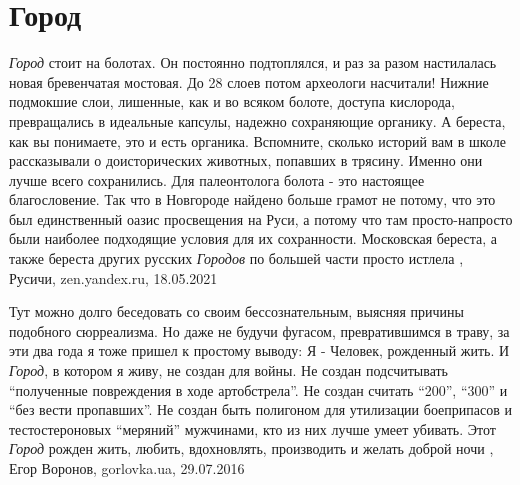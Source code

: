  
 
 
 
 
\chapter{Город}
\label{sec:slova.gorod}

\emph{Город} стоит на болотах. Он постоянно подтоплялся, и раз за разом настилалась
новая бревенчатая мостовая. До 28 слоев потом археологи насчитали! Нижние
подмокшие слои, лишенные, как и во всяком болоте, доступа кислорода,
превращались в идеальные капсулы, надежно сохраняющие органику. А береста, как
вы понимаете, это и есть органика.  Вспомните, сколько историй вам в школе
рассказывали о доисторических животных, попавших в трясину. Именно они лучше
всего сохранились. Для палеонтолога болота - это настоящее благословение.  Так
что в Новгороде найдено больше грамот не потому, что это был единственный оазис
просвещения на Руси, а потому что там просто-напросто были наиболее подходящие
условия для их сохранности. Московская береста, а также береста других русских
\emph{Городов} по большей части просто истлела
, 
Русичи, zen.yandex.ru, 18.05.2021

Тут можно долго беседовать со своим бессознательным, выясняя причины подобного
сюрреализма. Но даже не будучи фугасом, превратившимся в траву, за эти два года
я тоже пришел к простому выводу: Я - Человек, рожденный жить. И \emph{Город}, в
котором я живу, не создан для войны. Не создан подсчитывать \enquote{полученные
повреждения в ходе артобстрела}. Не создан считать \enquote{200}, \enquote{300} и \enquote{без вести
пропавших}. Не создан быть полигоном для утилизации боеприпасов и
тестостероновых \enquote{меряний} мужчинами, кто из них лучше умеет убивать. Этот \emph{Город}
рожден жить, любить, вдохновлять, производить и желать доброй ночи
, 
Егор Воронов, gorlovka.ua, 29.07.2016

